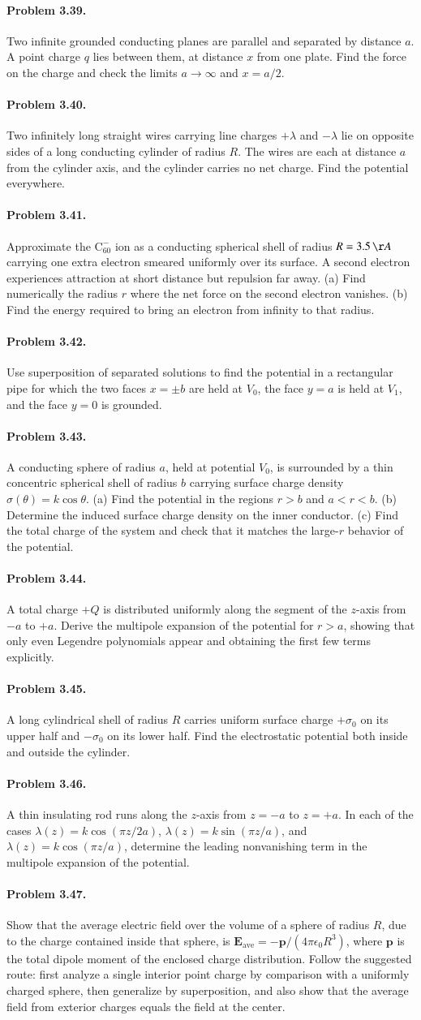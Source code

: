 \documentclass{aa}
\newcommand{\problemstatement}[2]{%
\paragraph{Problem #1.}#2\par\medskip
}
\begin{document}
\problemstatement{3.39}{Two infinite grounded conducting planes are parallel and separated by distance \(a\). A point charge \(q\) lies between them, at distance \(x\) from one plate. Find the force on the charge and check the limits \(a\to\infty\) and \(x=a/2\).}
\problemstatement{3.40}{Two infinitely long straight wires carrying line charges \(+\lambda\) and \(-\lambda\) lie on opposite sides of a long conducting cylinder of radius \(R\). The wires are each at distance \(a\) from the cylinder axis, and the cylinder carries no net charge. Find the potential everywhere.}
\problemstatement{3.41}{Approximate the \( \mathrm{C}_{60}^{-} \) ion as a conducting spherical shell of radius \(R=3.5\,\AA\) carrying one extra electron smeared uniformly over its surface. A second electron experiences attraction at short distance but repulsion far away. (a) Find numerically the radius \(r\) where the net force on the second electron vanishes. (b) Find the energy required to bring an electron from infinity to that radius.}
\problemstatement{3.42}{Use superposition of separated solutions to find the potential in a rectangular pipe for which the two faces \(x=\pm b\) are held at \(V_0\), the face \(y=a\) is held at \(V_1\), and the face \(y=0\) is grounded.}
\problemstatement{3.43}{A conducting sphere of radius \(a\), held at potential \(V_0\), is surrounded by a thin concentric spherical shell of radius \(b\) carrying surface charge density \(\sigma(\theta)=k\cos\theta\). (a) Find the potential in the regions \(r>b\) and \(a<r<b\). (b) Determine the induced surface charge density on the inner conductor. (c) Find the total charge of the system and check that it matches the large-\(r\) behavior of the potential.}
\problemstatement{3.44}{A total charge \(+Q\) is distributed uniformly along the segment of the \(z\)-axis from \(-a\) to \(+a\). Derive the multipole expansion of the potential for \(r>a\), showing that only even Legendre polynomials appear and obtaining the first few terms explicitly.}
\problemstatement{3.45}{A long cylindrical shell of radius \(R\) carries uniform surface charge \(+\sigma_0\) on its upper half and \(-\sigma_0\) on its lower half. Find the electrostatic potential both inside and outside the cylinder.}
\problemstatement{3.46}{A thin insulating rod runs along the \(z\)-axis from \(z=-a\) to \(z=+a\). In each of the cases \(\lambda(z)=k\cos(\pi z/2a)\), \(\lambda(z)=k\sin(\pi z/a)\), and \(\lambda(z)=k\cos(\pi z/a)\), determine the leading nonvanishing term in the multipole expansion of the potential.}
\problemstatement{3.47}{Show that the average electric field over the volume of a sphere of radius \(R\), due to the charge contained inside that sphere, is \(\mathbf{E}_{\mathrm{ave}}=-\mathbf{p}/(4\pi\epsilon_0 R^3)\), where \(\mathbf{p}\) is the total dipole moment of the enclosed charge distribution. Follow the suggested route: first analyze a single interior point charge by comparison with a uniformly charged sphere, then generalize by superposition, and also show that the average field from exterior charges equals the field at the center.}
\end{document}
